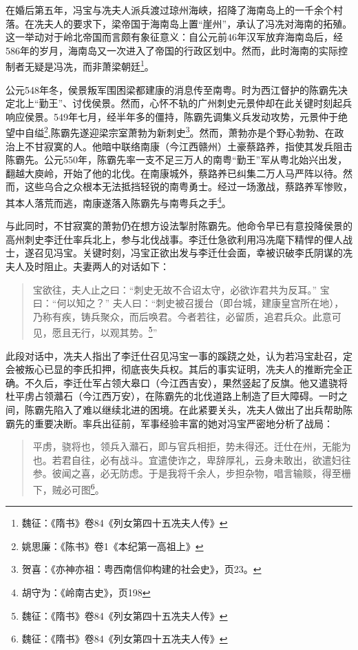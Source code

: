 在婚后第五年，冯宝与冼夫人派兵渡过琼州海峡，招降了海南岛上的一千余个村落。在冼夫人的要求下，梁帝国于海南岛上置“崖州”，承认了冯冼对海南的拓殖。这一举动对于岭北帝国而言颇有象征意义：自公元前46年汉军放弃海南岛后，经586年的岁月，海南岛又一次进入了帝国的行政区划中。然而，此时海南的实际控制者无疑是冯冼，而非萧梁朝廷\footnote{魏征：《隋书》卷84《列女第四十五冼夫人传》}。

公元548年冬，侯景叛军围困梁都建康的消息传至南粤。时为西江督护的陈霸先决定北上“勤王”、讨伐侯景。然而，心怀不轨的广州刺史元景仲却在此关键时刻起兵响应侯景。549年七月，经半年多的僵持，陈霸先调集义兵发动攻势，元景仲于绝望中自缢\footnote{姚思廉：《陈书》卷1《本纪第一高祖上》},陈霸先遂迎梁宗室萧勃为新刺史\footnote{贺喜：《亦神亦祖：粤西南信仰构建的社会史》，页23。}。然而，萧勃亦是个野心勃勃、在政治上不甘寂寞的人。他暗中联络南康（今江西赣州）土豪蔡路养，指使其发兵阻击陈霸先。公元550年，陈霸先率一支不足三万人的南粤“勤王”军从粤北始兴出发，翻越大庾岭，开始了他的北伐。在南康城外，蔡路养已纠集二万人马严阵以待。然而，这些乌合之众根本无法抵挡轻锐的南粤勇士。经过一场激战，蔡路养军惨败，其本人落荒而逃，南康遂落入陈霸先与南粤兵之手\footnote{胡守为：《岭南古史》，页198}。

与此同时，不甘寂寞的萧勃仍在想方设法掣肘陈霸先。他命令早已有意投降侯景的高州刺史李迁仕率兵北上，参与北伐战事。李迁仕急欲利用冯冼麾下精悍的俚人战士，遂召见冯宝。关键时刻，冯宝正欲出发与李迁仕会面，幸被识破李氏阴谋的冼夫人及时阻止。夫妻两人的对话如下：

\begin{quote}
	宝欲往，夫人止之曰：“刺史无故不合诏太守，必欲诈君共为反耳。”
	宝曰：“何以知之？”
	夫人曰：“刺史被召援台（即台城，建康皇宫所在地），乃称有疾，铸兵聚众，而后唤君。今者若往，必留质，追君兵众。此意可见，愿且无行，以观其势。\footnote{魏征：《隋书》卷84《列女第四十五冼夫人传》}”
\end{quote}

此段对话中，冼夫人指出了李迁仕召见冯宝一事的蹊跷之处，认为若冯宝赴召，定会被叛心已显的李氏扣押，彻底丧失兵权。其后的事实证明，冼夫人的推断完全正确。不久后，李迁仕军占领大皋口（今江西吉安），果然竖起了反旗。他又遣骁将杜平虏占领灨石（今江西万安），在陈霸先的北伐道路上制造了巨大障碍。一时之间，陈霸先陷入了难以继续北进的困境。在此紧要关头，冼夫人做出了出兵帮助陈霸先的重要决断。率兵出征前，军事经验丰富的她对冯宝严密地分析了战局：

\begin{quote}
	平虏，骁将也，领兵入灨石，即与官兵相拒，势未得还。迁仕在州，无能为也。若君自往，必有战斗。宜遣使诈之，卑辞厚礼，云身未敢出，欲遣妇往参。彼闻之喜，必无防虑。于是我将千余人，步担杂物，唱言输赕，得至栅下，贼必可图\footnote{魏征：《隋书》卷84《列女第四十五冼夫人传》}。
\end{quote}


